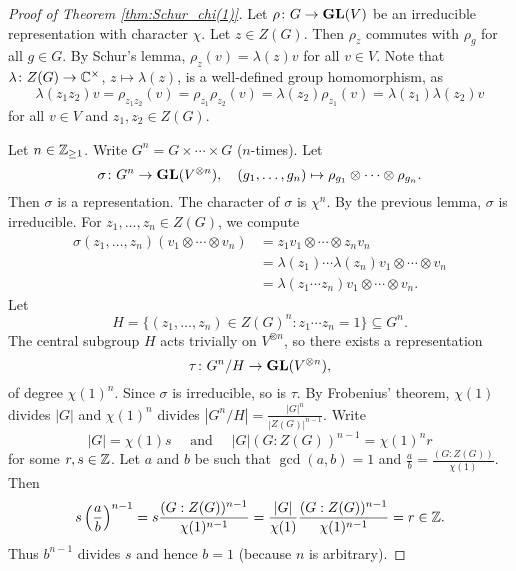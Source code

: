 \begin{proof}[Proof of Theorem \ref{thm:Schur_chi(1)}]
    Let $\rho\colon G\to\mathbf{GL}(V)$ be an irreducible representation 
    with character $\chi$. Let $z\in Z(G)$. Then $\rho_z$ commutes
    with $\rho_g$ for all $g\in G$. By Schur's lemma, 
    $\rho_z(v)=\lambda(z)v$ for all $v\in V$. Note that
    $\lambda\colon Z(G)\to\mathbb{C}^{\times}$, $z\mapsto\lambda(z)$, 
    is a well-defined group homomorphism, as 
    \[
    \lambda(z_1z_2)v=\rho_{z_1z_2}(v)=\rho_{z_1}\rho_{z_2}(v)
    =\lambda(z_2)\rho_{z_1}(v)=\lambda(z_1)\lambda(z_2)v
    \]
    for all $v\in V$ and $z_1,z_2\in Z(G)$. 
    
    Let $n\in\mathbb{Z}_{\geq1}$. Write $G^n=G\times\cdots\times G$ ($n$-times). Let
    \[
    \sigma\colon G^n\to\mathbf{GL}(V^{\otimes n}),\quad
    (g_1,\dots,g_n)\mapsto \rho_{g_1}\otimes\cdots\otimes\rho_{g_n}.
    \]
    Then $\sigma$ is a representation. 
    The character of $\sigma$ is $\chi^n$. By the previous lemma, 
    $\sigma$ is
    irreducible. For $z_1,\dots,z_n\in Z(G)$, we compute
    \begin{align*}   
    \sigma(z_1,\dots,z_n)(v_1\otimes\cdots\otimes v_n)&=z_1v_1\otimes\cdots\otimes z_nv_n\\
    &=\lambda(z_1)\cdots\lambda(z_n)v_1\otimes\cdots\otimes v_n\\
    &=\lambda(z_1\cdots z_n)v_1\otimes\cdots\otimes v_n.
    \end{align*}
    Let 
    \[
    H=\{(z_1,\dots,z_n)\in Z(G)^n:z_1\cdots z_n=1\}\subseteq G^n.
    \]  
    The central subgroup $H$ acts trivially on $V^{\otimes n}$, so there exists
    a representation 
    \[
    \tau\colon G^n/H\to\mathbf{GL}(V^{\otimes n}),
    \]
    of degree $\chi(1)^n$. 
    Since $\sigma$ is irreducible, so is $\tau$. 
    By Frobenius' theorem, $\chi(1)$ divides $|G|$ 
    and $\chi(1)^n$ divides $|G^n/H|=\frac{|G|^n}{|Z(G)|^{n-1}}$. 
    Write 
    \[
    |G|=\chi(1)s\quad\text{ and }\quad 
    |G|(G:Z(G))^{n-1}=\chi(1)^nr
    \]
    for some $r,s\in\mathbb{Z}$. Let $a$ and $b$ be such that 
    $\gcd(a,b)=1$ and 
    $\frac{a}{b}=\frac{(G:Z(G))}{\chi(1)}$. Then
    \[
    s\left(\frac{a}{b}\right)^{n-1}=s\frac{(G:Z(G))^{n-1}}{\chi(1)^{n-1}}
    =\frac{|G|}{\chi(1)}\frac{(G:Z(G))^{n-1}}{\chi(1)^{n-1}}=r\in\mathbb{Z}.
    \]
    Thus $b^{n-1}$ divides $s$ and hence $b=1$ (because $n$ is arbitrary).  
\end{proof}


